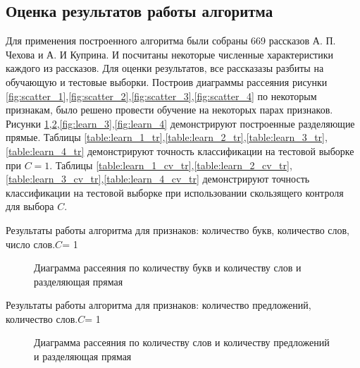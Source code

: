 \documentclass[%
bachelor,    %
subf,        %
href,        %
colorlinks,  %
]{disser}
\begin{document}
\subsection{Оценка результатов работы алгоритма}
Для применения построенного алгоритма были собраны 669 рассказов А. П. Чехова и А. И Куприна. И посчитаны некоторые численные характеристики каждого из рассказов.
Для оценки результатов, все рассказазы разбиты на обучающую и тестовые выборки.
Построив диаграммы рассеяния рисунки \ref{fig:scatter_1},\ref{fig:scatter_2},\ref{fig:scatter_3},\ref{fig:scatter_4} по некоторым признакам, было решено провести обучение на некоторых парах признаков.
Рисунки \ref{fig:learn_1},\ref{fig:learn_2},\ref{fig:learn_3},\ref{fig:learn_4} демонстрируют построенные разделяющие прямые. 
Таблицы \ref{table:learn_1_tr},\ref{table:learn_2_tr},\ref{table:learn_3_tr},\ref{table:learn_4_tr} демонстрируют точность классификации на тестовой выборке при $C=1$.
Таблицы \ref{table:learn_1_cv_tr},\ref{table:learn_2_cv_tr},\ref{table:learn_3_cv_tr},\ref{table:learn_4_cv_tr} демонстрируют точность классификации на тестовой выборке при использовании скользящего контроля для выбора $C$.
\newpage
\begin{center}
\begin{table}{}
	\centering
	\caption{Результаты работы алгоритма для признаков: количество букв, количество слов, число слов.$C$= 1}
	
	\label{table:learn_1_tr}
\end{table}		
\begin{figure}[t!]
	\centering		
	
	\caption{Диаграмма рассеяния по количеству букв и количеству слов и разделяющая прямая}
	\label{fig:learn_1}
\end{figure}
\end{center}
\newpage
\begin{center}
\begin{table}{}
	\centering	
	\caption{Результаты работы алгоритма для признаков: количество предложений, количество слов.$C$= 1}
	
	\label{table:learn_2_tr}
\end{table}		
\begin{figure}[t!]
	\centering		
	
	\caption{Диаграмма рассеяния по количеству слов и количеству предложений и разделяющая прямая}
	\label{fig:learn_2}
\end{figure}
\end{center}
\newpage
\end{document}
